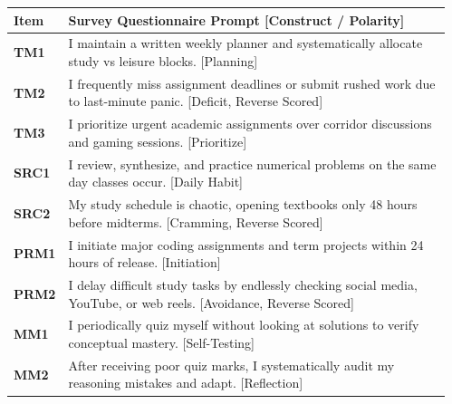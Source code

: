 \documentclass[aspectratio=169, 10pt]{beamer}
\begin{document}
\begin{frame}
\begin{columns}[T]
\begin{column}{0.495\textwidth}
\begin{tcolorbox}
      \end{tcolorbox}
    \end{column}
    \begin{column}{0.495\textwidth}
      \begin{tcolorbox}[colback=white, colframe=BluePrimary, arc=1.5mm, boxrule=0.8pt, top=0.3mm, bottom=0.3mm, left=0.8mm, right=0.8mm, title={\scriptsize\bfseries\color{white}Quadrant 2: Executive Regulation \& Study Habits}, colbacktitle=BluePrimary]
        \fontsize{4.5pt}{5.4pt}\selectfont
        \renewcommand{\arraystretch}{0.83}
        \begin{tabularx}{\linewidth}{@{}l X@{}}
          \toprule
          \textbf{Item} & \textbf{Survey Questionnaire Prompt [Construct / Polarity]} \\
          \midrule
          \rowcolor{BlueLight} \textbf{TM1} & I maintain a written weekly planner and systematically allocate study vs leisure blocks. [Planning] \\
          \rowcolor{BlueLight} \textbf{TM2} & I frequently miss assignment deadlines or submit rushed work due to last-minute panic. [Deficit, Reverse Scored] \\
          \rowcolor{BlueLight} \textbf{TM3} & I prioritize urgent academic assignments over corridor discussions and gaming sessions. [Prioritize] \\
          \midrule
          \rowcolor{CanvasBG} \textbf{SRC1} & I review, synthesize, and practice numerical problems on the same day classes occur. [Daily Habit] \\
          \rowcolor{CanvasBG} \textbf{SRC2} & My study schedule is chaotic, opening textbooks only 48 hours before midterms. [Cramming, Reverse Scored] \\
          \midrule
          \rowcolor{BlueLight} \textbf{PRM1} & I initiate major coding assignments and term projects within 24 hours of release. [Initiation] \\
          \rowcolor{BlueLight} \textbf{PRM2} & I delay difficult study tasks by endlessly checking social media, YouTube, or web reels. [Avoidance, Reverse Scored] \\
          \midrule
          \rowcolor{CanvasBG} \textbf{MM1} & I periodically quiz myself without looking at solutions to verify conceptual mastery. [Self-Testing] \\
          \rowcolor{CanvasBG} \textbf{MM2} & After receiving poor quiz marks, I systematically audit my reasoning mistakes and adapt. [Reflection] \\
          \bottomrule
        \end{tabularx}
      \end{tcolorbox}
    \end{column}
  \end{columns}
  \vspace{-0.25cm}


\end{frame}
\end{document}
